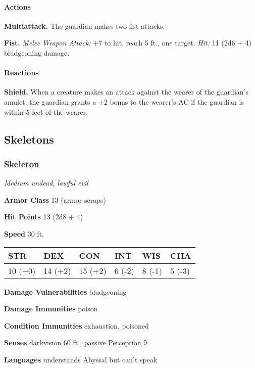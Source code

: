 \documentclass[
]{article}
\begin{document}
\hypertarget{actions-5}{%
\paragraph{Actions}\label{actions-5}}

\textbf{Multiattack.} The guardian makes two fist attacks.

\textbf{Fist.} \emph{Melee Weapon Attack:} +7 to hit, reach 5 ft., one
target. \emph{Hit:} 11 (2d6 + 4) bludgeoning damage.

\hypertarget{reactions}{%
\paragraph{Reactions}\label{reactions}}

\textbf{Shield.} When a creature makes an attack against the wearer of
the guardian's amulet, the guardian grants a +2 bonus to the wearer's AC
if the guardian is within 5 feet of the wearer.

\hypertarget{skeletons}{%
\subsection{Skeletons}\label{skeletons}}

\hypertarget{skeleton}{%
\subsubsection{Skeleton}\label{skeleton}}

\emph{Medium undead, lawful evil}

\textbf{Armor Class} 13 (armor scraps)

\textbf{Hit Points} 13 (2d8 + 4)

\textbf{Speed} 30 ft.

\begin{longtable}[]{@{}llllll@{}}
\toprule
STR & DEX & CON & INT & WIS & CHA\tabularnewline
\midrule
\endhead
10 (+0) & 14 (+2) & 15 (+2) & 6 (-2) & 8 (-1) & 5 (-3)\tabularnewline
\bottomrule
\end{longtable}

\textbf{Damage Vulnerabilities} bludgeoning

\textbf{Damage Immunities} poison

\textbf{Condition Immunities} exhaustion, poisoned

\textbf{Senses} darkvision 60 ft., passive Perception 9

\textbf{Languages} understands Abyssal but can't speak
\end{document}
